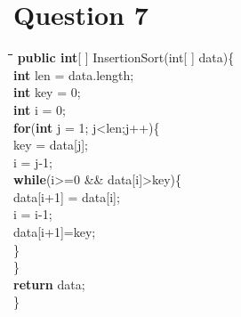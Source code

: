 \documentclass[a4paper,12pt]{article}
\begin{document}
\section{Question 7}
{\small
\begin{tabbing}	
\hspace*{15mm}\=\hspace*{10mm}\=%
\hspace*{5mm}\=\hspace*{5mm}\=\hspace*{5mm}\=\kill	
\textbf{public int}[ ] InsertionSort(int[ ] data)\{\\
\>\textbf{int} len = data.length;\\
\>\textbf{int} key = 0;\\
\>\textbf{int} i = 0;\\
\>\textbf{for}(\textbf{int} j = 1; j<len;j++)\{\\
\>\>key = data[j];\\
\>\>i = j-1;\\
\>\>\textbf{while}(i>=0 \&\& data[i]>key)\{\\
\>\>\>\>data[i+1] = data[i];\\
\>\>\>\>i = i-1;\\
\>\>\>\>data[i+1]=key;\\
\>\>\}\\
\>\}\\
\>\textbf{return} data;\\
\}
\end{tabbing}	
}
\end{document}
